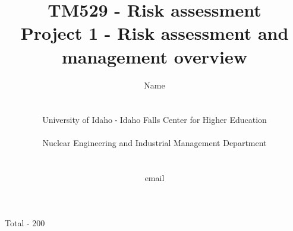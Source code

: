 \documentclass[11pt,a4paper]{article}
\newcommand*\sq{\mathbin{\vcenter{\hbox{\rule{.3ex}{.3ex}}}}} %
\begin{document}
\begin{titlepage}
    \title{
        TM529 - Risk assessment\\
        Project 1 - Risk assessment and management overview\\
    }
    \author{
        Name
        \\ \\ \\
        University of Idaho $\sq$ Idaho Falls Center for Higher Education
        \\ \\
        Nuclear Engineering and Industrial Management Department
        \\ \\ \\
        email 
    }
\clearpage %
\maketitle
\vspace*{\fill}
\begin{flushright}{
        Total - 200
}
\end{flushright}
\thispagestyle{empty} %
\end{titlepage}
\end{document}
